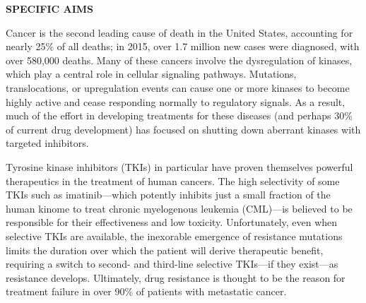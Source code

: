 \documentclass[11pt]{article}
\begin{document}





\noindent \begin{center}
{\bf SPECIFIC AIMS}
\end{center}

Cancer is the second leading cause of death in the United States, accounting for nearly 25\% of all deaths; in 2015, over 1.7 million new cases were diagnosed, with over 580,000 deaths.
Many of these cancers involve the dysregulation of kinases, which play a central role in cellular signaling pathways.
Mutations, translocations, or upregulation events can cause one or more kinases to become highly active and cease responding normally to regulatory signals.
As a result, much of the effort in developing treatments for these diseases (and perhaps 30\% of current drug development) has focused on shutting down aberrant kinases with targeted inhibitors.

Tyrosine kinase inhibitors (TKIs) in particular have proven themselves powerful therapeutics in the treatment of human cancers. %
The high selectivity of some TKIs such as imatinib---which potently inhibits just a small fraction of the human kinome to treat chronic myelogenous leukemia (CML)---is believed to be responsible for their effectiveness and low toxicity.
Unfortunately, even when selective TKIs are available, the inexorable emergence of resistance mutations limits the duration over which the patient will derive therapeutic benefit, requiring a switch to second- and third-line selective TKIs---if they exist---as resistance develops.
Ultimately, drug resistance is thought to be the reason for treatment failure in over 90\% of patients with metastatic cancer.
\end{document}
